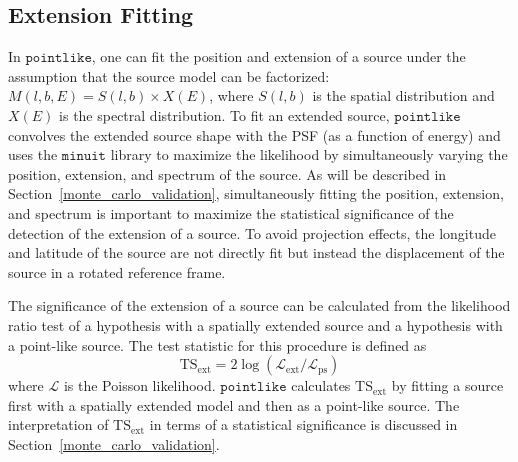 \documentclass[12pt,preprint]{aastex}
\newcommand{\tsext}{{\ensuremath{\text{TS}_{\text{ext}}}}\xspace}
\newcommand{\likelihood}{\ensuremath{\mathcal{L}}\xspace}
\newcommand{\pointlike}{\ensuremath{\mathtt{pointlike}}\xspace}
\newcommand{\minuit}{\ensuremath{\mathtt{minuit}}\xspace}
\begin{document}
\subsection{Extension Fitting}
\label{extension_fitting}

In \pointlike, one can fit the position and extension 
of a source under the assumption that the source model
can be factorized:
$M(l,b,E)=S(l,b)\times X(E)$, where $S(l,b)$ is the spatial distribution
and $X(E)$ is the spectral distribution.  To fit an extended source,
\pointlike convolves the extended source shape with the PSF (as a function
of energy) and uses the \minuit library \citep{minuit_documentation}
to maximize the likelihood by simultaneously varying the position,
extension, and spectrum of the source.  As will be described in
Section~\ref{monte_carlo_validation}, simultaneously fitting the
position, extension, and spectrum is important to maximize
the statistical significance of the detection of the extension of a source.
To avoid projection effects, the longitude and latitude 
of the source are
not directly fit but instead the displacement of the source in a rotated
reference frame.

The significance of the extension of a source can be calculated from the
likelihood ratio test of a hypothesis with a spatially extended source and
a hypothesis with a point-like source. The test statistic for this procedure
is defined as
\begin{equation}
  \tsext=2\log(\likelihood_\text{ext}/\likelihood_\text{ps}) 
\end{equation}
where \likelihood is the Poisson likelihood.
\pointlike calculates \tsext by fitting a source first with a spatially
extended model and then as a point-like source.  The interpretation
of \tsext in terms of a statistical significance is discussed in
Section~\ref{monte_carlo_validation}.
\end{document}

